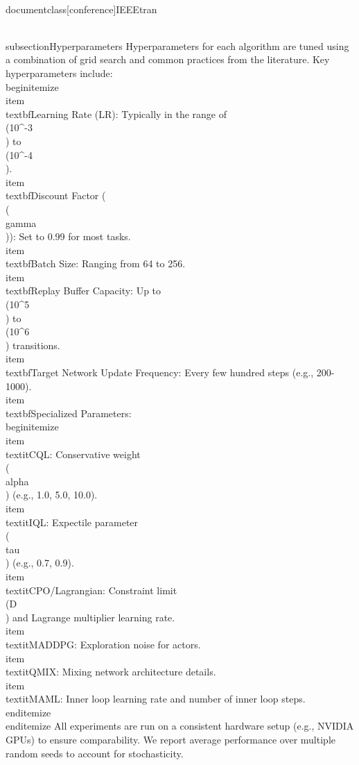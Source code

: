 \\documentclass[conference]{IEEEtran}
\begin{document}
\\subsection{Hyperparameters}
Hyperparameters for each algorithm are tuned using a combination of grid search and common practices from the literature. Key hyperparameters include:
\\begin{itemize}
    \\item \\textbf{Learning Rate (LR):} Typically in the range of \\(10^{-3}\\) to \\(10^{-4}\\).
    \\item \\textbf{Discount Factor (\\(\\gamma\\)):} Set to 0.99 for most tasks.
    \\item \\textbf{Batch Size:} Ranging from 64 to 256.
    \\item \\textbf{Replay Buffer Capacity:} Up to \\(10^5\\) to \\(10^6\\) transitions.
    \\item \\textbf{Target Network Update Frequency:} Every few hundred steps (e.g., 200-1000).
    \\item \\textbf{Specialized Parameters:}
    \\begin{itemize}
        \\item \\textit{CQL:} Conservative weight \\(\\alpha\\) (e.g., 1.0, 5.0, 10.0).
        \\item \\textit{IQL:} Expectile parameter \\(\\tau\\) (e.g., 0.7, 0.9).
        \\item \\textit{CPO/Lagrangian:} Constraint limit \\(D\\) and Lagrange multiplier learning rate.
        \\item \\textit{MADDPG:} Exploration noise for actors.
        \\item \\textit{QMIX:} Mixing network architecture details.
        \\item \\textit{MAML:} Inner loop learning rate and number of inner loop steps.
    \\end{itemize}
\\end{itemize}
All experiments are run on a consistent hardware setup (e.g., NVIDIA GPUs) to ensure comparability. We report average performance over multiple random seeds to account for stochasticity.
\end{document}
